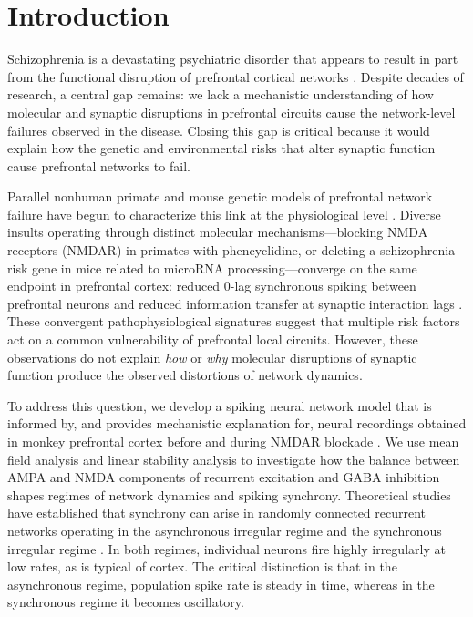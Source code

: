 \section{Introduction}

Schizophrenia is a devastating psychiatric disorder that appears to result in
part from the functional disruption of prefrontal cortical networks
\citep{insel2010rethinking, jauhar2022schizophrenia}. Despite decades of research,
a central gap remains: we lack a mechanistic understanding of how molecular and
synaptic disruptions in prefrontal circuits cause the network-level failures
observed in the disease. Closing this gap is critical because it would explain
how the genetic and environmental risks that alter synaptic function cause
prefrontal networks to fail.

Parallel nonhuman primate and mouse genetic models of prefrontal network failure
have begun to characterize this link at the physiological level
\citep{zick2018blocking, kummerfeld2020cognitive, zick2021disparate}. Diverse
insults operating through distinct molecular mechanisms---blocking NMDA
receptors (NMDAR) in primates with phencyclidine, or deleting a schizophrenia
risk gene in mice related to microRNA processing---converge on the same
endpoint in prefrontal cortex: reduced 0-lag synchronous spiking between
prefrontal neurons and reduced information transfer at synaptic interaction
lags \citep{zick2018blocking, zick2021disparate}. These convergent
pathophysiological signatures suggest that multiple risk factors act on a
common vulnerability of prefrontal local circuits. However, these observations
do not explain \textit{how} or \textit{why} molecular disruptions of synaptic
function produce the observed distortions of network dynamics.

To address this question, we develop a spiking neural network model that is
informed by, and provides mechanistic explanation for, neural recordings
obtained in monkey prefrontal cortex before and during NMDAR blockade
\citep{zick2018blocking}. We use mean field analysis and linear stability
analysis to investigate how the balance between AMPA and NMDA components of
recurrent excitation and GABA inhibition shapes regimes of network dynamics
and spiking synchrony. Theoretical studies have established that synchrony can
arise in randomly connected recurrent networks operating in the asynchronous
irregular regime \citep{brunel2000dynamics, vanvreeswijk1996chaos,
renart2010asynchronous} and the synchronous irregular regime
\citep{brunel2000dynamics, brunel1999fast, brunel2003fast}. In both regimes,
individual neurons fire highly irregularly at low rates, as is typical of
cortex. The critical distinction is that in the asynchronous regime, population
spike rate is steady in time, whereas in the synchronous regime it becomes
oscillatory.

